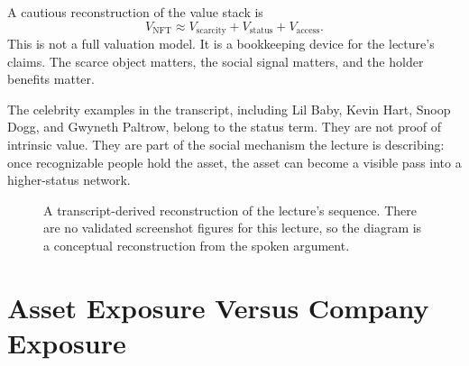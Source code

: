 A cautious reconstruction of the value stack is
\begin{equation}
V_{\mathrm{NFT}}
\approx
V_{\mathrm{scarcity}}
+
V_{\mathrm{status}}
+
V_{\mathrm{access}}.
\end{equation}
This is not a full valuation model. It is a bookkeeping device for the lecture's claims. The scarce object matters, the social signal matters, and the holder benefits matter.

The celebrity examples in the transcript, including Lil Baby, Kevin Hart, Snoop Dogg, and Gwyneth Paltrow, belong to the status term. They are not proof of intrinsic value. They are part of the social mechanism the lecture is describing: once recognizable people hold the asset, the asset can become a visible pass into a higher-status network.

\begin{figure}
\centering
{}
\caption{A transcript-derived reconstruction of the lecture's sequence. There are no validated screenshot figures for this lecture, so the diagram is a conceptual reconstruction from the spoken argument.}
\end{figure}

\section{Asset Exposure Versus Company Exposure}

